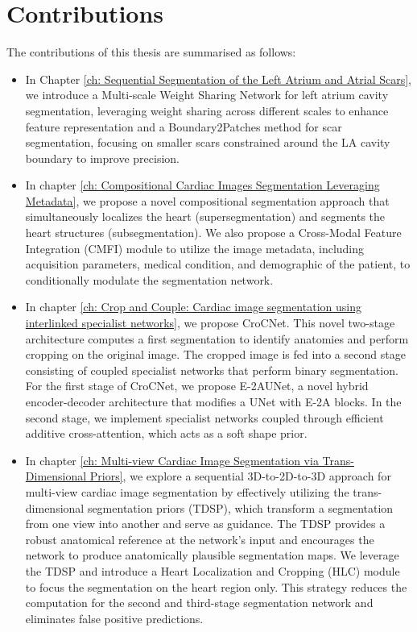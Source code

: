 \section{Contributions}
The contributions of this thesis are summarised as follows:
\begin{itemize}
    \item In Chapter \ref{ch: Sequential Segmentation of the Left Atrium and Atrial Scars}, we introduce a Multi-scale Weight Sharing Network for left atrium cavity segmentation, leveraging weight sharing across different scales to enhance feature representation and a Boundary2Patches method for scar segmentation, focusing on smaller scars constrained around the LA cavity boundary to improve precision.
    \item In chapter \ref{ch: Compositional Cardiac Images Segmentation Leveraging Metadata}, we propose a novel compositional segmentation approach that simultaneously localizes the heart (supersegmentation) and segments the heart structures (subsegmentation). We also propose a Cross-Modal Feature Integration (CMFI) module to utilize the image metadata, including acquisition parameters, medical condition, and demographic of the patient, to conditionally modulate the segmentation network.
    \item In chapter \ref{ch: Crop and Couple: Cardiac image segmentation using interlinked specialist networks}, we propose CroCNet. This novel two-stage architecture computes a first segmentation to identify anatomies
    and perform cropping on the original image. The cropped image is fed into a second stage consisting of coupled specialist networks that perform binary segmentation. For the first stage of CroCNet, we propose E-2AUNet, a novel hybrid encoder-decoder architecture that modifies a UNet with E-2A blocks. In the second stage, we implement specialist networks coupled through efficient additive cross-attention, which acts as a soft shape prior.
    \item In chapter \ref{ch: Multi-view Cardiac Image Segmentation via Trans-Dimensional Priors}, we explore a sequential 3D-to-2D-to-3D approach for multi-view cardiac image segmentation by effectively utilizing the trans-dimensional segmentation priors (TDSP), which transform a segmentation from one view into another and serve as guidance. The TDSP provides a robust anatomical reference at the network’s input and encourages the network to produce anatomically plausible segmentation maps. We leverage the TDSP and introduce a Heart Localization and Cropping (HLC) module to focus the segmentation on the heart region only. This strategy reduces the computation for the second and third-stage segmentation network and eliminates false positive predictions.

\end{itemize}
